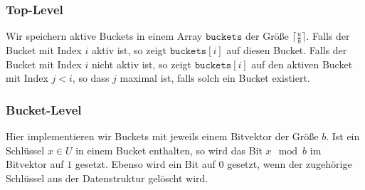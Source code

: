 \subsubsection{Top-Level}

Wir speichern aktive Buckets in einem Array $\texttt{buckets}$ der Größe $\lceil \tfrac{u}{b} \rceil$. Falls der Bucket mit Index $i$ aktiv ist, so zeigt $\texttt{buckets}[i]$ auf diesen Bucket. Falls der Bucket mit Index $i$ nicht aktiv ist, so zeigt $\texttt{buckets}[i]$ auf den aktiven Bucket mit Index $j < i$, so dass $j$ maximal ist, falls solch ein Bucket existiert.

\subsubsection{Bucket-Level}

Hier implementieren wir Buckets mit jeweils einem Bitvektor der Größe $b$. Ist ein Schlüssel $x \in U$ in einem Bucket enthalten, so wird das Bit $x \mod b$ im Bitvektor auf $1$ gesetzt. Ebenso wird ein Bit auf $0$ gesetzt, wenn der zugehörige Schlüssel aus der Datenstruktur gelöscht wird.

